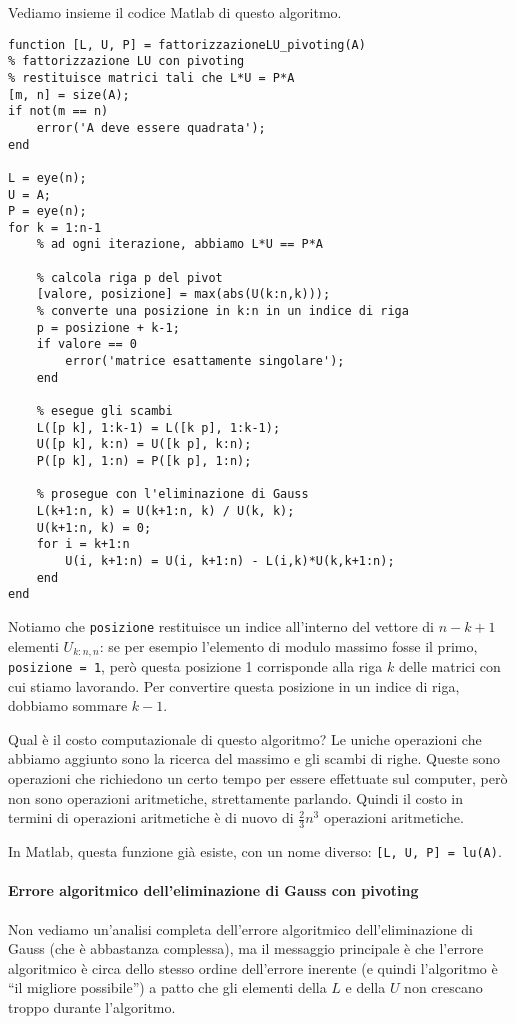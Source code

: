 \documentclass[a4paper]{report}
\theoremstyle{definiton}
\theoremstyle{remark}
\begin{document}
Vediamo insieme il codice Matlab di questo algoritmo.
\begin{lstlisting}
function [L, U, P] = fattorizzazioneLU_pivoting(A)
% fattorizzazione LU con pivoting
% restituisce matrici tali che L*U = P*A
[m, n] = size(A);
if not(m == n)
    error('A deve essere quadrata');
end

L = eye(n);
U = A;
P = eye(n);
for k = 1:n-1
    % ad ogni iterazione, abbiamo L*U == P*A

    % calcola riga p del pivot
    [valore, posizione] = max(abs(U(k:n,k)));
    % converte una posizione in k:n in un indice di riga
    p = posizione + k-1;
    if valore == 0
        error('matrice esattamente singolare');
    end

    % esegue gli scambi
    L([p k], 1:k-1) = L([k p], 1:k-1);
    U([p k], k:n) = U([k p], k:n);
    P([p k], 1:n) = P([k p], 1:n);

    % prosegue con l'eliminazione di Gauss
    L(k+1:n, k) = U(k+1:n, k) / U(k, k);
    U(k+1:n, k) = 0;
    for i = k+1:n
        U(i, k+1:n) = U(i, k+1:n) - L(i,k)*U(k,k+1:n);
    end
end    
\end{lstlisting}
Notiamo che \lstinline{posizione} restituisce un indice all'interno del vettore di $n-k+1$ elementi $U_{k:n,n}$: se per esempio l'elemento di modulo massimo fosse il primo, \lstinline{posizione = 1}, però questa posizione 1 corrisponde alla riga $k$ delle matrici con cui stiamo lavorando. Per convertire questa posizione in un indice di riga, dobbiamo sommare $k-1$.

Qual è il costo computazionale di questo algoritmo? Le uniche operazioni che abbiamo aggiunto sono la ricerca del massimo e gli scambi di righe. Queste sono operazioni che richiedono un certo tempo per essere effettuate sul computer, però non sono operazioni aritmetiche, strettamente parlando. Quindi il costo in termini di operazioni aritmetiche è di nuovo di $\frac23 n^3$ operazioni aritmetiche.

In Matlab, questa funzione già esiste, con un nome diverso: \lstinline{[L, U, P] = lu(A)}.

\paragraph{Errore algoritmico dell'eliminazione di Gauss con pivoting}
Non vediamo un'analisi completa dell'errore algoritmico dell'eliminazione di Gauss (che è abbastanza complessa), ma il messaggio principale è che l'errore algoritmico è circa dello stesso ordine dell'errore inerente (e quindi l'algoritmo è ``il migliore possibile'') a patto che gli elementi della $L$ e della $U$ non crescano troppo durante l'algoritmo.
\end{document}
